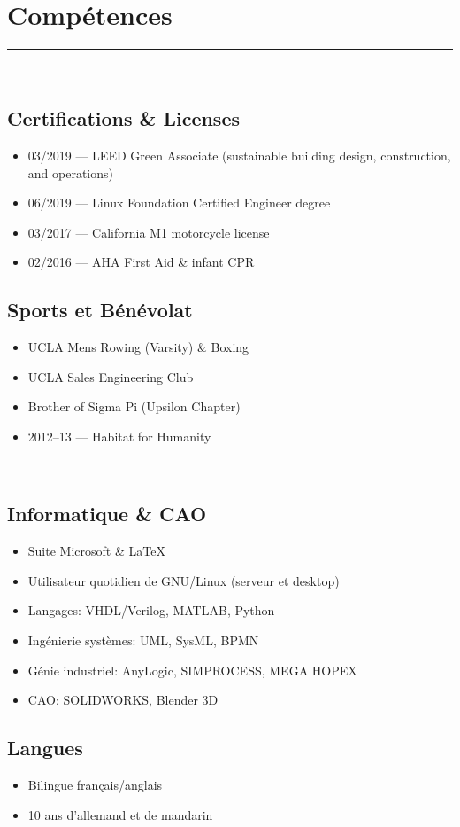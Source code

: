 \documentclass[10pt]{report}
\begin{document}
\section*{Compétences}
\rule{\linewidth}{1pt}\\[0.2cm]
\begin{minipage}[t]{0.48\linewidth}
    \subsection*{Certifications \& Licenses}
    \begin{itemize}
        \item 03/2019 --- LEED Green Associate (sustainable building design, construction, and operations)
        \item 06/2019 --- Linux Foundation Certified Engineer degree
        \item 03/2017 --- California M1 motorcycle license
        \item 02/2016 --- AHA First Aid \& infant CPR
    \end{itemize}
    \subsection*{Sports et Bénévolat}
    \begin{itemize}
        \item UCLA Mens Rowing (Varsity) \& Boxing
        \item UCLA Sales Engineering Club
        \item Brother of Sigma Pi (Upsilon Chapter)
        \item 2012--13 --- Habitat for Humanity
    \end{itemize}
\end{minipage}
~
\begin{minipage}[t]{0.48\linewidth}
    \subsection*{Informatique \& CAO}
    \begin{itemize}
        \item Suite Microsoft \& \LaTeX
        \item Utilisateur quotidien de GNU/Linux (serveur et desktop)
        \item Langages: VHDL/Verilog, MATLAB, Python
        \item Ingénierie systèmes: UML, SysML, BPMN
        \item Génie industriel: AnyLogic, SIMPROCESS, MEGA HOPEX
        \item CAO: SOLIDWORKS, Blender 3D
    \end{itemize}
    \subsection*{Langues}
    \begin{itemize}
        \item Bilingue français/anglais
        \item 10 ans d'allemand et de mandarin
    \end{itemize}
\end{minipage}
\end{document}
